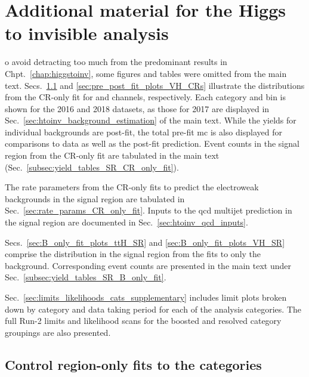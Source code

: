\chapter{Additional material for the Higgs to invisible analysis}
\label{app:supplementary_hinv_plots}

o avoid detracting too much from the predominant results in Chpt.~\ref{chap:higgstoinv}, some figures and tables were omitted from the main text. Secs.~\ref{sec:pre_post_fit_plots_ttH_CRs} and \ref{sec:pre_post_fit_plots_VH_CRs} illustrate the distributions from the \gls{CR}-only fit for \ttH and \VH channels, respectively. Each category and \ptmiss bin is shown for the 2016 and 2018 datasets, as those for 2017 are displayed in Sec.~\ref{sec:htoinv_background_estimation} of the main text. While the yields for individual backgrounds are post-fit, the total pre-fit \acrshort{mc} is also displayed for comparisons to data as well as the post-fit prediction. Event counts in the signal region from the \gls{CR}-only fit are tabulated in the main text (Sec.~\ref{subsec:yield_tables_SR_CR_only_fit}).

The rate parameters from the \gls{CR}-only fits to predict the electroweak backgrounds in the signal region are tabulated in Sec.~\ref{sec:rate_params_CR_only_fit}. Inputs to the \acrshort{qcd} multijet prediction in the signal region are documented in Sec.~\ref{sec:htoinv_qcd_inputs}.

Secs.~\ref{sec:B_only_fit_plots_ttH_SR} and \ref{sec:B_only_fit_plots_VH_SR} comprise the \ptmiss distribution in the signal region from the fits to only the background. Corresponding event counts are presented in the main text under Sec.~\ref{subsec:yield_tables_SR_B_only_fit}.

Sec.~\ref{sec:limits_likelihoods_cats_supplementary} includes limit plots broken down by category and data taking period for each of the analysis categories. The full Run-2 limits and likelihood scans for the boosted and resolved category groupings are also presented.

\clearpage



\section{Control region-only fits to the \texorpdfstring{\ttH}{ttH} categories}
\label{sec:pre_post_fit_plots_ttH_CRs}

